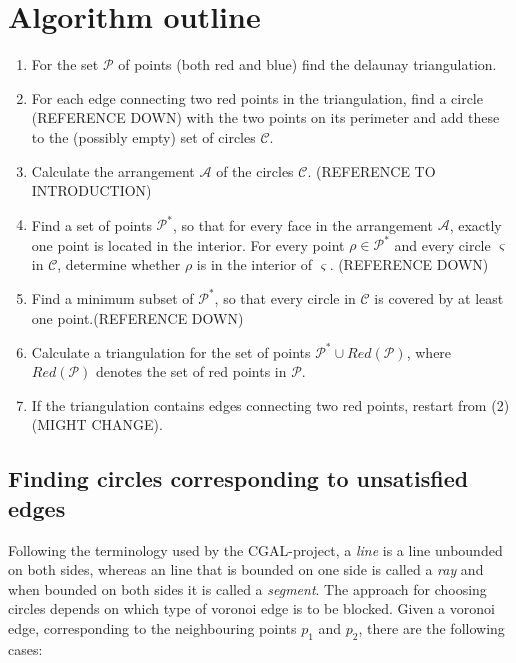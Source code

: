\documentclass[a4paper,12pt]{article}
\begin{document}
\section{Algorithm outline}
\begin{enumerate}
\item
For the set $\mathcal P$ of points (both red and blue) find the delaunay triangulation.
\item
For each edge connecting two red points in the triangulation, find a circle (REFERENCE DOWN) with the two points on its perimeter and add these to the (possibly empty) set of circles $\mathcal C$.
\item
Calculate the arrangement $\mathcal A$ of the circles $\mathcal C$. (REFERENCE TO INTRODUCTION)
\item
Find a set of points $\mathcal P^*$, so that for every face in the arrangement $\mathcal A$, exactly one point is located in the interior. For every point $\rho  \in \mathcal P^*$ and every circle $\varsigma$ in $\mathcal C$, determine whether $\rho$ is in the interior of $\varsigma$. (REFERENCE DOWN)
\item
Find a minimum subset of $\mathcal P^*$, so that every circle in $\mathcal C$ is covered by at least one point.(REFERENCE DOWN)
\item
Calculate a triangulation for the set of points $\mathcal P^* \cup Red(\mathcal P )$, where  $Red(\mathcal P )$ denotes the set of red points in $\mathcal P$.
\item
If the triangulation contains edges connecting two red points, restart from (2) (MIGHT CHANGE).
\end{enumerate}

\subsection{Finding circles corresponding to unsatisfied edges}

Following the terminology used by the CGAL-project, a \emph{line} is a line unbounded on both sides, whereas an line that is bounded on one side is called a \emph{ray} and when bounded on both sides it is called a \emph{segment}. The approach for choosing circles depends on which type of voronoi edge is to be blocked. Given a voronoi edge, corresponding to the neighbouring points $p_1$ and $p_2$, there are the following cases:
\end{document}

